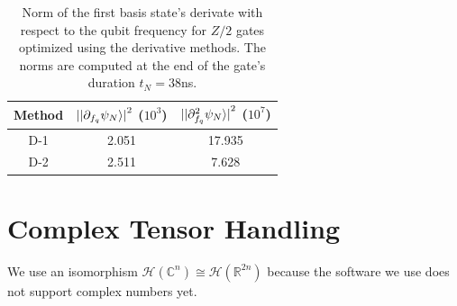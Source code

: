 \documentclass[
  amsfonts,
  amsmath,
  tbtags,
  amssymb,
  aps,
  nobibnotes,
  twocolumn,
  superscriptaddress,
]{revtex4-2}
\begin{document}
\begin{table}
  \begin{tabular}{c | c | c}
    Method & ${\lvert \ket{\partial_{f_{q}} \psi_{N}} \rvert}^{2}$ ($10^{3}$)
    & ${\lvert \ket{\partial^{2}_{f_{q}} \psi_{N}} \rvert}^{2}$ ($10^{7}$)\\
    \hline
    D-1 & 2.051 & 17.935\\
    D-2 & 2.511 & 7.628\\
  \end{tabular}
  \caption{Norm of the first basis state's derivate with respect to the qubit frequency
    for $Z/2$ gates optimized using the derivative methods. The norms are computed
    at the end of the gate's duration $t_{N} = 38$ns.}
\end{table}


\section{Complex Tensor Handling}
We use an isomorphism $\mathcal{H}(\mathbb{C}^{n}) \cong \mathcal{H}(\mathbb{R}^{2n})$
because the software we use does not support complex numbers yet.



\end{document}
